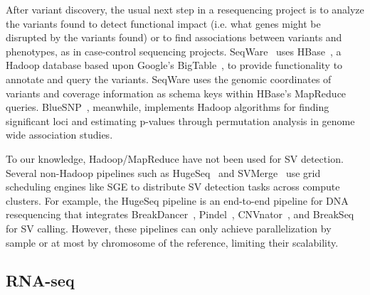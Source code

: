 After variant discovery, the usual next step in a resequencing project is to analyze the variants found to detect functional impact (i.e. what genes might be disrupted by the variants found) or to find associations between variants and phenotypes, as in case-control sequencing projects. SeqWare~\cite{Oconnor:2010p1835} uses HBase~\cite{hbase}, a Hadoop database based upon Google's BigTable~\cite{Chang:2008:BDS:1365815.1365816}, to provide functionality to annotate and query the variants. SeqWare uses the genomic coordinates of variants and coverage information as schema keys within HBase's MapReduce queries. BlueSNP~\cite{Huang:2012bb}, meanwhile, implements Hadoop algorithms for finding significant loci and estimating p-values through permutation analysis in genome wide association studies.

To our knowledge, Hadoop/MapReduce have not been used for SV detection. Several non-Hadoop pipelines such as HugeSeq~\cite{Lam:2012jy} and SVMerge~\cite{Wong:2010p1271} use grid scheduling engines like SGE to distribute SV detection tasks across compute clusters. For example, the HugeSeq pipeline is an end-to-end pipeline for DNA resequencing that integrates BreakDancer~\cite{Chen:2009p3}, Pindel~\cite{Ye:2009p2}, CNVnator~\cite{Abyzov:2011bk}, and BreakSeq~\cite{Lam:2010p1383} for SV calling. However, these pipelines can only achieve parallelization by sample or at most by chromosome of the reference, limiting their scalability.

\subsection{RNA-seq}

